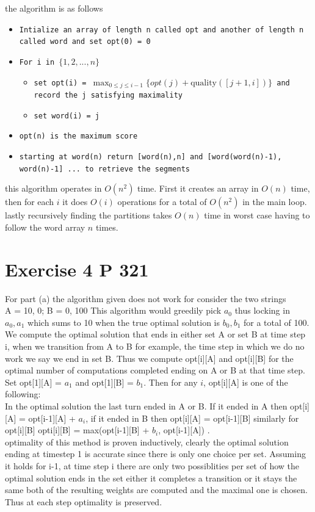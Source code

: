\documentclass{amsart}
\begin{document}
the algorithm is as follows
{\small
    \begin{itemize}
        \item \texttt{Intialize an array of length n called opt and another of length n called word and set opt(0) = 0}
        \item \texttt{For i in $\{1,2,...,n\}$}
             \begin{itemize}
                 \item \texttt{set opt(i) = $\max_{0 \le j \le i-1}\{opt(j) + \text{quality}([j+1,i])\}$ and record the j satisfying maximality}
                 \item \texttt{set word(i) = j}
            \end{itemize}
        \item \texttt{opt(n) is the maximum score}
        \item \texttt{starting at word(n) return [word(n),n] and [word(word(n)-1), word(n)-1] ... to retrieve the segments}
    \end{itemize}
} 
this algorithm operates in $O(n^2)$
time. First it creates an array in $O(n)$ time, then for each $i$ it does $O(i)$ operations for a total of $O(n^2)$ in the 
main loop. lastly recursively finding the partitions takes $O(n)$ time in worst case having to follow the word array $n$ times.

\section{Exercise 4 P 321}
For part (a) the algorithm given does not work for consider the two strings\\
A = 10, 0; B = 0, 100
This algorithm would greedily pick $a_0$ thus locking in $a_0,a_1$ which sums to 10 when the true optimal solution is $b_0,b_1$ for a total of 100.
\\
We compute the optimal solution that ends in either set A or set B at time step i, when we transition from A to B for example, the time step in which we do no work
we say we end in set B. Thus we compute
opt[i][A] and opt[i][B] for the optimal number of computations completed ending on A or B at that time step. Set opt[1][A] = $a_1$ and opt[1][B] = $b_1$.
Then for any $i$, opt[i][A] is one of the following:\\
In the optimal solution the last turn ended in A or B. If it ended in A then opt[i][A] = opt[i-1][A] + $a_i$, if it ended in B then opt[i][A] = opt[i-1][B]
similarly for opt[i][B]
opti[i][B] = max(opt[i-1][B] +  $b_i$, opt[i-1][A])
.\\
optimality of this method is proven inductively, clearly the optimal solution ending at timestep 1 is accurate since there is only one choice per set.
Assuming it holds for i-1, at time step i there are only two possiblities per set of how the optimal solution ends in the set either it completes a transition or it stays the same
both of the resulting weights are computed and the maximal one is chosen. Thus at each step optimality is preserved.
\end{document}
